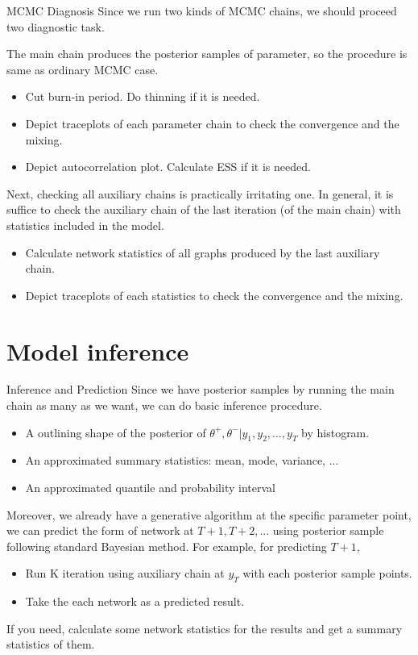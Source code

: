\documentclass[aspectratio=169,ignorenonframetext,9pt]{beamer}
\theoremstyle{plain}
\theoremstyle{definition}
\begin{document}
\begin{frame}{MCMC Diagnosis}
    Since we run two kinds of MCMC chains, we should proceed two diagnostic task.
    
    The main chain produces the posterior samples of parameter, so the procedure is same as ordinary MCMC case.
    \begin{itemize}
        \item Cut burn-in period. Do thinning if it is needed.
        \item Depict traceplots of each parameter chain to check the convergence and the mixing.
        \item Depict autocorrelation plot. Calculate ESS if it is needed.
    \end{itemize}

    Next, checking all auxiliary chains is practically irritating one. 
    In general, it is suffice to check the auxiliary chain of the last iteration (of the main chain)
    with statistics included in the model.
    \begin{itemize}
        \item Calculate network statistics of all graphs produced by the last auxiliary chain.
        \item Depict traceplots of each statistics to check the convergence and the mixing.
    \end{itemize}
\end{frame}


\section{Model inference}
\begin{frame}{Inference and Prediction}
    Since we have posterior samples by running the main chain as many as we want, we can do basic inference procedure.
    \begin{itemize}
        \item A outlining shape of the posterior of $\theta^+,\theta^-|y_1,y_2,...,y_T$ by histogram.
        \item An approximated summary statistics: mean, mode, variance, ...
        \item An approximated quantile and probability interval
    \end{itemize}
    
    Moreover, we already have a generative algorithm at the specific parameter point,
    we can predict the form of network at $T+1,T+2,...$ using posterior sample following standard Bayesian method.
    For example, for predicting $T+1$,
    \begin{itemize}
        \item Run K iteration using auxiliary chain at $y_T$ with each posterior sample points.
        \item Take the each network as a predicted result.
    \end{itemize}
    If you need, calculate some network statistics for the results and get a summary statistics of them.
\end{frame}
\end{document}
